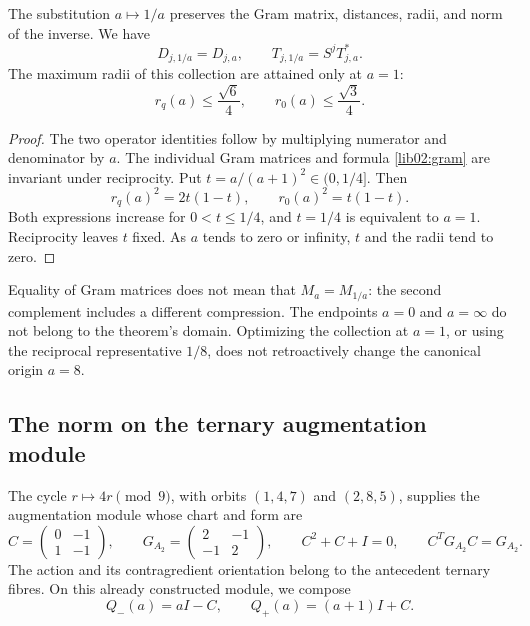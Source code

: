 \begin{proposition}
\label{lib02:dualidad-a}
The substitution \(a\mapsto1/a\) preserves the Gram matrix, distances, radii, and norm of the inverse. We have
\[
 D_{j,1/a}=D_{j,a},\qquad
 T_{j,1/a}=S^jT_{j,a}^*.
\]
The maximum radii of this collection are attained only at \(a=1\):
\[
 r_q(a)\leq\frac{\sqrt6}{4},\qquad
 r_0(a)\leq\frac{\sqrt3}{4}.
\]
\end{proposition}
\begin{proof}
The two operator identities follow by multiplying numerator and denominator by \(a\). The individual Gram matrices and formula \eqref{lib02:gram} are invariant under reciprocity. Put \(t=a/(a+1)^2\in(0,1/4]\). Then
\[
 r_q(a)^2=2t(1-t),\qquad r_0(a)^2=t(1-t).
\]
Both expressions increase for \(0<t\leq1/4\), and \(t=1/4\) is equivalent to \(a=1\). Reciprocity leaves \(t\) fixed. As \(a\) tends to zero or infinity, \(t\) and the radii tend to zero.
\end{proof}

Equality of Gram matrices does not mean that \(M_a=M_{1/a}\): the second complement includes a different compression. The endpoints \(a=0\) and \(a=\infty\) do not belong to the theorem's domain. Optimizing the collection at \(a=1\), or using the reciprocal representative \(1/8\), does not retroactively change the canonical origin \(a=8\).

\subsection{The norm on the ternary augmentation module}
\label{lib02:modulo-ternario}

The cycle \(r\mapsto4r\pmod9\), with orbits \((1,4,7)\) and \((2,8,5)\), supplies the augmentation module whose chart and form are
\[
 C=\begin{pmatrix}0&-1\\1&-1\end{pmatrix},\qquad
 G_{A_2}=\begin{pmatrix}2&-1\\-1&2\end{pmatrix},\qquad
 C^2+C+I=0,\qquad C^TG_{A_2}C=G_{A_2}.
\]
The action and its contragredient orientation belong to the antecedent ternary fibres. On this already constructed module, we compose
\[
 Q_-(a)=aI-C,\qquad Q_+(a)=(a+1)I+C.
\]

